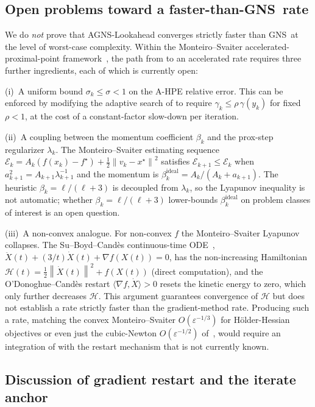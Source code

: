 \documentclass[conference]{IEEEtran}
\theoremstyle{remark}
\newcommand{\norm}[1]{\left\lVert#1\right\rVert}
\newcommand{\AGNS}{\textsc{AGNS}}
\newcommand{\GNS}{\textsc{GNS}}
\begin{document}
\subsection{Open problems toward a faster-than-\GNS\ rate}
\label{app:open}

We do \emph{not} prove that \AGNS-Lookahead converges strictly faster
than \GNS\ at the level of worst-case complexity. Within the
Monteiro--Svaiter accelerated-proximal-point
framework~\cite{monteiro2013accelerated}, the path from
 to an accelerated rate requires three further
ingredients, each of which is currently open:

(i)~A uniform bound $\sigma_k \le \sigma < 1$ on the A-HPE relative
error. This can be enforced by modifying the adaptive search of
 to require $\gamma_k \le \rho\,\gamma(y_k)$ for fixed
$\rho < 1$, at the cost of a constant-factor slow-down per iteration.

(ii)~A coupling between the momentum coefficient $\beta_k$ and the
prox-step regularizer $\lambda_k$. The Monteiro--Svaiter estimating
sequence
$\mathcal{E}_k = A_k(f(x_k) - f^\star) + \tfrac12\norm{v_k - x^\star}^2$
satisfies $\mathcal{E}_{k+1} \le \mathcal{E}_k$ when
$a_{k+1}^2 = A_{k+1}\lambda_{k+1}^{-1}$ and the momentum is
$\beta_k^{\mathrm{ideal}} = A_k / (A_k + a_{k+1})$. The heuristic
$\beta_k = \ell/(\ell+3)$ is decoupled from $\lambda_k$, so the
Lyapunov inequality is not automatic; whether
$\beta_k = \ell/(\ell+3)$ lower-bounds $\beta_k^{\mathrm{ideal}}$ on
problem classes of interest is an open question.

(iii)~A non-convex analogue. For non-convex $f$ the
Monteiro--Svaiter Lyapunov collapses. The Su--Boyd--Cand\`es
continuous-time ODE~\cite{su2014differential},
$\ddot X(t) + (3/t)\dot X(t) + \nabla f(X(t)) = 0$, has the
non-increasing Hamiltonian
$\mathcal{H}(t) = \tfrac12\norm{\dot X(t)}^2 + f(X(t))$
(direct computation), and the O'Donoghue--Cand\`es restart
$\langle\nabla f, \dot X\rangle > 0$ resets the kinetic energy to
zero, which only further decreases $\mathcal{H}$. This argument
guarantees convergence of $\mathcal{H}$ but does not establish a
rate strictly faster than the gradient-method rate. Producing such
a rate, matching the convex Monteiro--Svaiter
$O(\varepsilon^{-1/3})$ for H\"older-Hessian objectives or even just
the cubic-Newton $O(\varepsilon^{-1/2})$
of~\cite{nesterov2006cubic}, would require an integration of
 with the restart mechanism that is not currently
known.

\subsection{Discussion of gradient restart and the iterate anchor}
\end{document}
